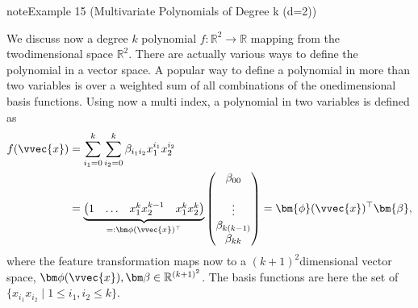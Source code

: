 \documentclass[letterpaper,10pt,english]{jupyterBook}
\begin{document}
\begin{sphinxadmonition}{note}{Example 15 (Multivariate Polynomials of Degree k (d=2))}


\begin{center}\end{center}
\sphinxAtStartPar
We discuss now a degree \(k\) polynomial \(f:\mathbb{R}^2\rightarrow \mathbb{R}\) mapping from the two\sphinxhyphen{}dimensional space \(\mathbb{R}^2\). There are actually various ways to define the polynomial in a vector space. A popular way to define a polynomial in more than two variables is over a weighted sum of all combinations of the one\sphinxhyphen{}dimensional basis functions. Using now a multi index, a polynomial in two variables is defined as
\begin{align*}
    f(\vvec{x})&=\sum_{i_1=0}^k\sum_{i_2=0}^k\beta_{i_1i_2}x_1^{i_1}x_2^{i_2}\\
    &= \underbrace{\begin{pmatrix}1 &  \ldots & x_1^{k}x_2^{k-1}&x_1^kx_2^k\end{pmatrix}}_{=:\bm\phi(\vvec{x})^\top}
    \begin{pmatrix}\beta_{00} \\ \\\vdots \\ 
    \beta_{k(k-1)}\\
    \beta_{kk}
    \end{pmatrix}= \bm{\phi}(\vvec{x})^\top\bm{\beta},
\end{align*}
\sphinxAtStartPar
where the feature transformation maps now to a \((k+1)^2\)\sphinxhyphen{}dimensional vector space, \(\bm\phi(\vvec{x}),\bm\beta\in\mathbb{R}^{(k+1)^2}\). The basis functions are here the set of \(\{x_{i_1}x_{i_2}\mid 1\leq i_1,i_2\leq k\}\).
\end{sphinxadmonition}
\end{document}
